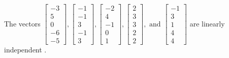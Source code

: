 \begin{exercise}
\begin{exerciseStatement}
  \end{exerciseStatement}
  \begin{exerciseAnswer}
   The vectors \(\left[\begin{array}{r}
-3 \\
5 \\
0 \\
-6 \\
-5
\end{array}\right] , \left[\begin{array}{r}
-1 \\
-1 \\
3 \\
-1 \\
3
\end{array}\right] , \left[\begin{array}{r}
-2 \\
4 \\
-1 \\
0 \\
1
\end{array}\right] , \left[\begin{array}{r}
2 \\
3 \\
3 \\
2 \\
2
\end{array}\right] , \text{ and } \left[\begin{array}{r}
-1 \\
3 \\
1 \\
4 \\
4
\end{array}\right]\) are 
  	 linearly independent  .
  


  \end{exerciseAnswer}
\end{exercise}